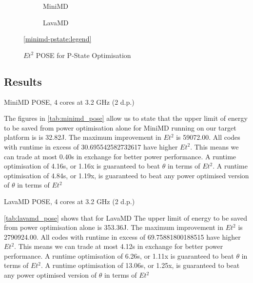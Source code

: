 \begin{figure}[t]%
\begin{subfigure}[t]{.5\linewidth}%
\centering%
%
\caption{MiniMD}%
\end{subfigure}%
\begin{subfigure}[t]{.5\linewidth}%
%
\caption{LavaMD}%
\end{subfigure}%
\begin{center}%
\ref{minimd-pstate:legend}%
\end{center}%
\caption{$Et^2$ POSE for P-State Optimisation}%
\label{fig:pstates}%
\end{figure}%

\subsection{Results}

\begin{table}
\centering
\caption{MiniMD POSE, 4 cores at 3.2 GHz (2 d.p.)}

\label{tab:minimd_pose}
\end{table} 



The figures in \autoref{tab:minimd_pose} allow us to state that the upper limit of energy to be saved from power optimisation alone for MiniMD running on our target platform is is 32.82J.
The maximum improvement in $Et^2$ is 59072.00.
All codes with runtime in excess of 30.695542582732617 have higher $Et^2$.
This means we can trade at most 0.40s in exchange for better power performance.
A runtime optimisation of 4.16s, or 1.16x is guaranteed to beat $\theta$ in terms of $Et^2$. 
A runtime optimisation of 4.84s, or 1.19x, is guaranteed to beat any power optimised version of $\theta$ in terms of $Et^2$ 


\begin{table}
\centering
\caption{LavaMD POSE, 4 cores at 3.2 GHz (2 d.p.)}

\label{tab:lavamd_pose}
\end{table} 

\autoref{tab:lavamd_pose} shows that for LavaMD The upper limit of energy to be saved from power optimisation alone is 353.36J.
The maximum improvement in $Et^2$ is 2790924.00.
All codes with runtime in excess of 69.75881800188515 have higher $Et^2$.
This means we can trade at most 4.12s in exchange for better power performance.
A runtime optimisation of 6.26s, or 1.11x is guaranteed to beat $\theta$ in terms of $Et^2$. 
A runtime optimisation of 13.06s, or 1.25x, is guaranteed to beat any power optimised version of $\theta$ in terms of $Et^2$ 


